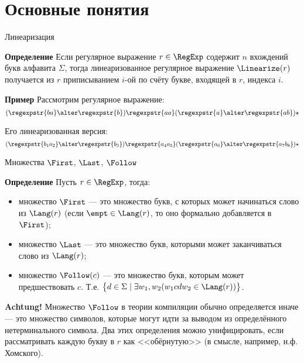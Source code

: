 \section{Основные понятия}
\begin{frame}{Линеаризация}
  \begin{block}{\bf Определение}
    Если регулярное выражение $r\in\RegExp$ содержит $n$ вхождений букв алфавита $\Sigma$, тогда линеаризованное регулярное выражение $\Linearize(r)$ получается из $r$ приписыванием $i$-ой по счёту букве, входящей в $r$, индекса $i$.
  \end{block} %

  \begin{exampleblock}{\bf Пример}
    Рассмотрим регулярное выражение:
    \[(\regexpstr{ba}\alter \regexpstr{b})\regexpstr{aa}(\regexpstr{a}\alter\regexpstr{ab})\star\] %

    Его линеаризованная версия:
    \[(\regexpstr{b_{1}a_{2}}\alter \regexpstr{b_{3}})\regexpstr{a_{4}a_{5}}(\regexpstr{a_{6}}\alter\regexpstr{a_{7}b_{8}})\star\] %

  \end{exampleblock}

\end{frame}

\begin{frame}{Множества $\First$, $\Last$, $\Follow$}
  \vspace{-5pt}%
  \begin{block}{\bf Определение}
    Пусть $r\in\RegExp$, тогда:
    \begin{itemize}
      \item множество $\First$ --- это множество букв, с которых может начинаться слово из $\Lang(r)$ (если $\empt\in\Lang(r)$, то оно формально добавляется в $\First$);
      \item множество $\Last$ --- это множество букв, которыми может заканчиваться слово из $\Lang(r)$;
      \item множество $\Follow(c)$ --- это множество букв, которым может предшествовать $c$. Т.е. $\bigl\lbrace d\in\Sigma\mid \exists w_1,w_2(w_1 c d w_2\in\Lang(r))\bigr\rbrace$.
    \end{itemize}
  \end{block} %

  \begin{alertblock}{\bf Achtung!}
    \small
    Множество $\Follow$ в теории компиляции обычно определяется иначе --- это множество символов, которые могут идти за выводом из определённого нетерминального символа. Два этих определения можно унифицировать, если рассматривать каждую букву в $r$ как <<обёрнутую>> (в смысле, например, н.ф. Хомского).
  \end{alertblock} %
\end{frame}

